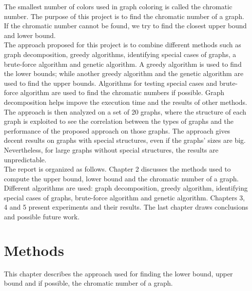 \documentclass[a4paper]{report}
\begin{document}
	The smallest number of colors used in graph coloring is called the chromatic number. The purpose of this project is to find the chromatic number of a graph. If the chromatic number cannot be found, we try to find the closest upper bound and lower bound.\\
	
	The approach proposed for this project is to combine different methods such as graph decomposition, greedy algorithms, identifying special cases of graphs, a brute-force algorithm and genetic algorithm. A greedy algorithm is used to find the lower bounds; while another greedy algorithm and the genetic algorithm are used to find the upper bounds. Algorithms for testing special cases and brute-force algorithm are used to find the chromatic numbers if possible. Graph decomposition helps impove the execution time and the results of other methods. The approach is then analyzed on a set of 20 graphs, where the structure of each graph is exploited to see the correlation between the types of graphs and the performance of the proposed approach on those graphs. The approach gives decent results on graphs with special structures, even if the graphs' sizes are big. Nevertheless, for large graphs without special structures, the results are unpredictable. \\

	The report is organized as follows. Chapter 2 discusses the methods used to compute the upper bound, lower bound and the chromatic number of a graph. Different algorithms are used: graph decomposition, greedy algorithm, identifying special cases of graphs, brute-force algorithm and genetic algorithm. Chapters 3, 4 and 5 present experiments and their results. The last chapter draws conclusions and possible future work.
	
	\chapter{Methods}
	This chapter describes the approach used for finding the lower bound, upper bound and if possible, the chromatic number of a graph. 
\end{document}
